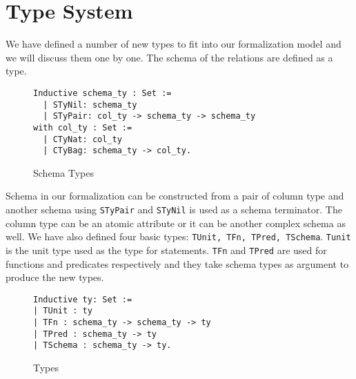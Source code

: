 \section{Type System}
\label{sec:types}

We have defined a number of new types to fit into our formalization model and we will discuss them one by one. The schema of the relations are defined as a type.

\begin{figure}
\begin{lstlisting}
Inductive schema_ty : Set :=
  | STyNil: schema_ty
  | STyPair: col_ty -> schema_ty -> schema_ty
with col_ty : Set :=
  | CTyNat: col_ty
  | CTyBag: schema_ty -> col_ty.
\end{lstlisting}
\caption{Schema Types}
\label{fig-schema_types}
\end{figure}

Schema in our formalization can be constructed from a pair of column type and another schema using \texttt{STyPair} and \texttt{STyNil} is used as a schema terminator. The column type can be an atomic attribute or it can be another complex schema as well. We have also defined four basic types: \texttt{TUnit, TFn, TPred, TSchema}. \texttt{Tunit} is the unit type used as the type for statements. \texttt{TFn} and \texttt{TPred} are used for functions and predicates respectively and they take schema types as argument to produce the new types.

\begin{figure}
\begin{lstlisting}
Inductive ty: Set :=
| TUnit : ty
| TFn : schema_ty -> schema_ty -> ty
| TPred : schema_ty -> ty
| TSchema : schema_ty -> ty.
\end{lstlisting}
\caption{Types}
\label{fig-types}
\end{figure}

